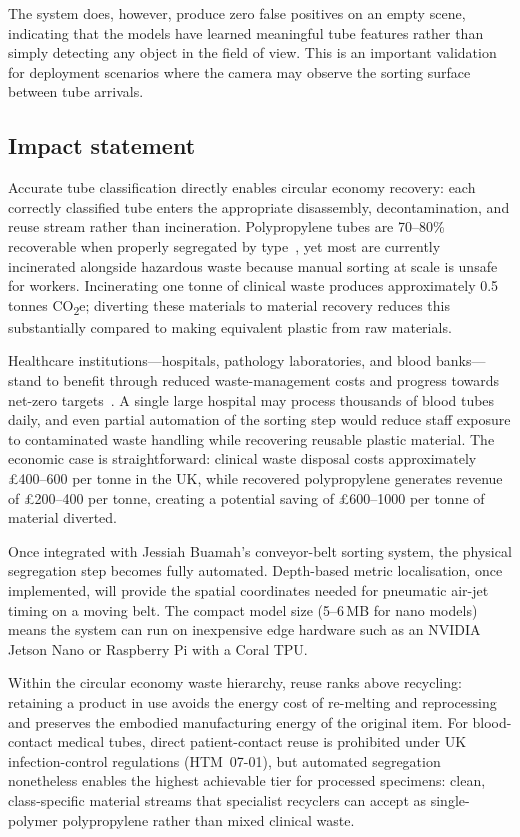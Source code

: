 \documentclass{Academic}
\begin{document}
The system does, however, produce zero false positives on an empty scene, indicating that the models have learned meaningful tube features rather than simply detecting any object in the field of view. This is an important validation for deployment scenarios where the camera may observe the sorting surface between tube arrivals.

\subsection{Impact statement}

Accurate tube classification directly enables circular economy recovery: each correctly classified tube enters the appropriate disassembly, decontamination, and reuse stream rather than incineration. Polypropylene tubes are 70--80\% recoverable when properly segregated by type~\supercite{lee2004medical}, yet most are currently incinerated alongside hazardous waste because manual sorting at scale is unsafe for workers. Incinerating one tonne of clinical waste produces approximately 0.5\,tonnes CO\textsubscript{2}e; diverting these materials to material recovery reduces this substantially compared to making equivalent plastic from raw materials.

Healthcare institutions---hospitals, pathology laboratories, and blood banks---stand to benefit through reduced waste-management costs and progress towards net-zero targets~\supercite{nhs2022netzero}. A single large hospital may process thousands of blood tubes daily, and even partial automation of the sorting step would reduce staff exposure to contaminated waste handling while recovering reusable plastic material. The economic case is straightforward: clinical waste disposal costs approximately \pounds400--600 per tonne in the UK, while recovered polypropylene generates revenue of \pounds200--400 per tonne, creating a potential saving of \pounds600--1000 per tonne of material diverted.

Once integrated with Jessiah Buamah's conveyor-belt sorting system, the physical segregation step becomes fully automated. Depth-based metric localisation, once implemented, will provide the spatial coordinates needed for pneumatic air-jet timing on a moving belt. The compact model size (5--6\,MB for nano models) means the system can run on inexpensive edge hardware such as an NVIDIA Jetson Nano or Raspberry Pi with a Coral TPU.

Within the circular economy waste hierarchy, reuse ranks above recycling: retaining a product in use avoids the energy cost of re-melting and reprocessing and preserves the embodied manufacturing energy of the original item. For blood-contact medical tubes, direct patient-contact reuse is prohibited under UK infection-control regulations (HTM~07-01), but automated segregation nonetheless enables the highest achievable tier for processed specimens: clean, class-specific material streams that specialist recyclers can accept as single-polymer polypropylene rather than mixed clinical waste.
\end{document}
